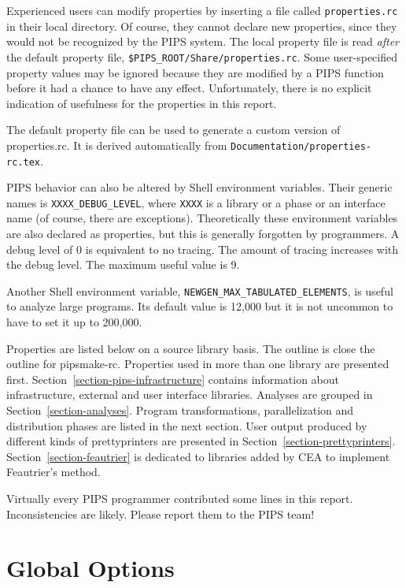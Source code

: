 Experienced users can modify properties by inserting a file called
\verb+properties.rc+ in their local directory. Of course, they cannot
declare new properties, since they would not be recognized by the PIPS
system. The local property file is read {\em after} the default property
file, \verb+$PIPS_ROOT/Share/properties.rc+.
Some user-specified property
values may be ignored because they are modified by a PIPS function before
it had a chance to have any effect. Unfortunately, there is no explicit
indication of usefulness for the properties in this report.

The default property file can be used to generate a custom version of
properties.rc. It is derived automatically from
\verb+Documentation/properties-rc.tex+.

PIPS behavior can also be altered by Shell environment variables. Their
generic names is \verb+XXXX_DEBUG_LEVEL+, where \verb+XXXX+ is a library
or a phase or an interface name (of course, there are
exceptions). Theoretically these environment variables are also declared
as properties, but this is generally forgotten by programmers. A debug
level of 0 is equivalent to no tracing. The amount of tracing increases
with the debug level. The maximum useful value is 9.

Another Shell environment variable, \verb+NEWGEN_MAX_TABULATED_ELEMENTS+,
is useful to analyze large programs. Its default value is 12,000 but it is
not uncommon to have to set it up to 200,000.

Properties are listed below on a source library basis. The outline is
close the outline for pipsmake-rc\cite{}.  Properties used in more than
one library are presented
first. Section~\ref{section-pips-infrastructure} contains information
about infrastructure, external and user interface libraries. Analyses
are grouped in Section~\ref{section-analyses}. Program transformations,
parallelization and distribution phases are listed in the next
section. User output produced by different kinds of prettyprinters are
presented in
Section~\ref{section-prettyprinters}. Section~\ref{section-feautrier} is
dedicated to libraries added by CEA to implement Feautrier's method.

Virtually every PIPS programmer contributed some lines in this
report. Inconsistencies are likely. Please report them to the PIPS team!




\section{Global Options}

